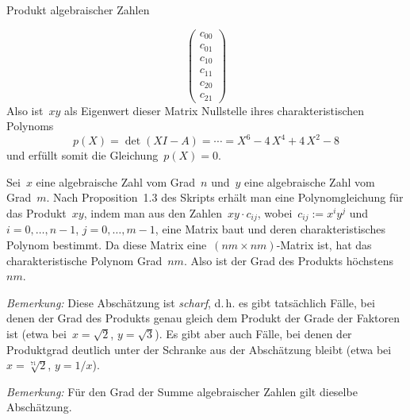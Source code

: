 \documentclass{algblatt}
\begin{document}
\begin{aufgabe}{Produkt algebraischer Zahlen}
\begin{loesungE}
\[  \begin{pmatrix}c_{00}\\c_{01}\\c_{10}\\c_{11}\\c_{20}\\c_{21}\end{pmatrix}
\]
Also ist~$xy$ als Eigenwert dieser Matrix Nullstelle ihres charakteristischen
Polynoms
\[ p(X) = \det(X I - A) = \cdots = X^6 - 4\,X^4 + 4\,X^2 - 8 \]
und erfüllt somit die Gleichung~$p(X) = 0$.
\item Sei~$x$ eine algebraische Zahl vom Grad~$n$ und~$y$ eine algebraische
Zahl vom Grad~$m$. Nach Proposition~1.3 des Skripts erhält man eine
Polynomgleichung für das Produkt~$xy$, indem man aus den Zahlen~$xy \cdot
c_{ij}$, wobei~$c_{ij} := x^i y^j$ und~$i = 0,\ldots,n-1$, $j = 0,\ldots,m-1$,
eine Matrix baut und deren charakteristisches Polynom bestimmt. Da diese Matrix
eine~$(nm \times nm)$-Matrix ist, hat das charakteristische Polynom Grad~$nm$.
Also ist der Grad des Produkts höchstens~$nm$.

\emph{Bemerkung:} Diese Abschätzung ist \emph{scharf}, d.\,h. es gibt
tatsächlich Fälle, bei denen der Grad des Produkts genau gleich dem Produkt der
Grade der Faktoren ist (etwa bei~$x = \sqrt{2}$, $y = \sqrt{3}$). Es gibt aber
auch Fälle, bei denen der Produktgrad deutlich unter der Schranke aus der
Abschätzung bleibt (etwa bei~$x = \sqrt[71]{2}$, $y = 1/x$).

\emph{Bemerkung:} Für den Grad der Summe algebraischer Zahlen gilt dieselbe
Abschätzung.
\end{loesungE}
\end{aufgabe}
\end{document}
